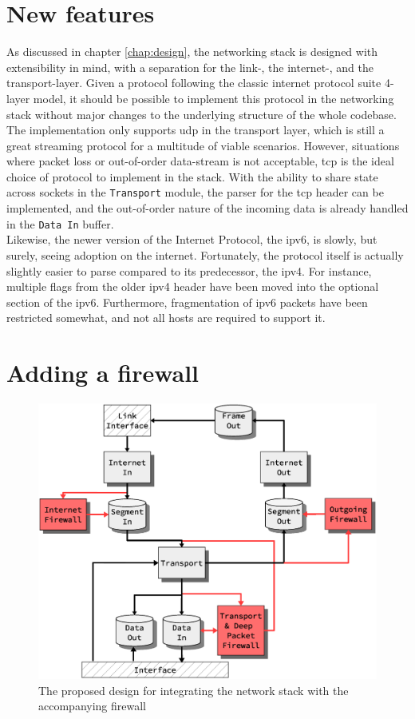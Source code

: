 \section{New features}
As discussed in chapter \ref{chap:design}, the networking stack is designed
with extensibility in mind, with a separation for the link-, the internet-, and
the transport-layer. Given a protocol following the classic internet protocol
suite 4-layer model, it should be possible to implement this protocol in the
networking stack without major changes to the underlying structure of the whole
codebase.\\
The implementation only supports \gls{udp} in the transport layer, which is
still a great streaming protocol for a multitude of viable scenarios. However,
situations where packet loss or out-of-order data-stream is not acceptable,
\gls{tcp} is the ideal choice of protocol to implement in the stack. With the
ability to share state across sockets in the \texttt{Transport} module, the
parser for the \gls{tcp} header can be implemented, and the out-of-order nature
of the incoming data is already handled in the \texttt{Data In} buffer.\\
Likewise, the newer version of the Internet Protocol, the \gls{ipv6}, is slowly, but
surely, seeing adoption on the internet. Fortunately, the protocol itself is
actually slightly easier to parse compared to its predecessor, the \gls{ipv4}.
For instance, multiple flags from the older \gls{ipv4} header have been moved
into the optional section of the \gls{ipv6}. Furthermore, fragmentation of
\gls{ipv6} packets have been restricted somewhat, and not all hosts are required
to support it\cite{ipv6_proposed}.


\section{Adding a firewall}
\begin{figure}
\centering
\includegraphics[scale=0.50]{future_work/firewall_integration_design.eps}
\caption{The proposed design for integrating the network stack with the
accompanying firewall}
\label{fig:firewall_integration_design}
\end{figure}


